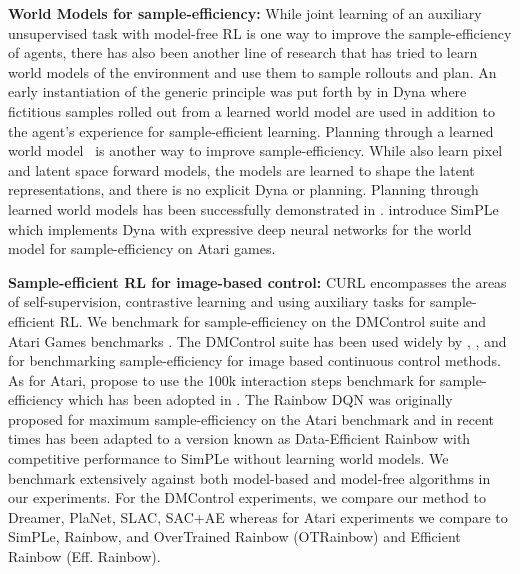 {\textbf{World Models for sample-efficiency:}} While joint learning of an auxiliary unsupervised task with model-free RL is one way to improve the sample-efficiency of agents, there has also been another line of research that has tried to learn world models of the environment and use them to sample rollouts and plan. An early instantiation of the generic principle was put forth by \citet{sutton1990integrated} in Dyna where fictitious samples rolled out from a learned world model are used in addition to the agent's experience for sample-efficient learning. Planning through a learned world model~\cite{srinivas2018universal} is another way to improve sample-efficiency. While \citet{jaderberg2016reinforcement, oord2018representation, lee2019stochastic} also learn pixel and latent space forward models, the models are learned to shape the latent representations, and there is no explicit Dyna or planning.
Planning through learned world models has been successfully demonstrated in \citet{ha2018world, hafner2018learning, hafner2019dream}. \citet{kaiser2019model} introduce SimPLe which implements Dyna with expressive deep neural networks for the world model for sample-efficiency on Atari games.

{\textbf{Sample-efficient RL for image-based control:}} CURL encompasses the areas of self-supervision, contrastive learning and using auxiliary tasks for sample-efficient RL. We benchmark for sample-efficiency on the DMControl suite \citep{tassa2018deepmind} and Atari Games benchmarks \cite{bellemare2013arcade}. The DMControl suite has been used widely by \citet{yarats2019improving}, \citet{hafner2018learning}, \citet{hafner2019dream} and \citet{lee2019stochastic} for benchmarking sample-efficiency for image based continuous control methods. As for Atari, \citet{kaiser2019model} propose to use the 100k interaction steps benchmark for sample-efficiency which has been adopted in \citet{kielak2020rainbow,  van2019use}. The Rainbow DQN \cite{hessel2017rainbow} was originally proposed for maximum sample-efficiency on the Atari benchmark and in recent times has been adapted to a version known as Data-Efficient Rainbow \cite{van2019use} with competitive performance to SimPLe without learning world models. We benchmark extensively against both model-based and model-free algorithms in our experiments. For the DMControl experiments, we compare our method to Dreamer, PlaNet, SLAC, SAC+AE whereas for Atari experiments we compare to SimPLe, Rainbow, and OverTrained Rainbow (OTRainbow) and Efficient Rainbow (Eff. Rainbow).
